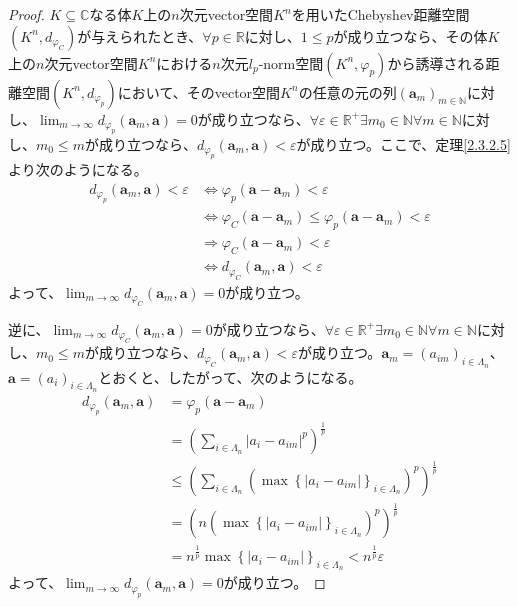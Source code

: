 \documentclass[dvipdfmx]{jsarticle}
\begin{document}
\begin{proof}
$K \subseteq \mathbb{C}$なる体$K$上の$n$次元vector空間$K^{n}$を用いたChebyshev距離空間$\left( K^{n},d_{\varphi_{C}} \right)$が与えられたとき、$\forall p \in \mathbb{R}$に対し、$1 \leq p$が成り立つなら、その体$K$上の$n$次元vector空間$K^{n}$における$n$次元$l_{p}$-norm空間$\left( K^{n},\varphi_{p} \right)$から誘導される距離空間$\left( K^{n},d_{\varphi_{p}} \right)$において、そのvector空間$K^{n}$の任意の元の列$\left( \mathbf{a}_{m} \right)_{m \in \mathbb{N}}$に対し、$\lim_{m \rightarrow \infty}{d_{\varphi_{p}}\left( \mathbf{a}_{m},\mathbf{a} \right)} = 0$が成り立つなら、$\forall\varepsilon \in \mathbb{R}^{+}\exists m_{0} \in \mathbb{N}\forall m \in \mathbb{N}$に対し、$m_{0} \leq m$が成り立つなら、$d_{\varphi_{p}}\left( \mathbf{a}_{m},\mathbf{a} \right) < \varepsilon$が成り立つ。ここで、定理\ref{2.3.2.5}より次のようになる。
\begin{align*}
d_{\varphi_{p}}\left( \mathbf{a}_{m},\mathbf{a} \right) < \varepsilon &\Leftrightarrow \varphi_{p}\left( \mathbf{a} - \mathbf{a}_{m} \right) < \varepsilon\\
&\Leftrightarrow \varphi_{C}\left( \mathbf{a} - \mathbf{a}_{m} \right) \leq \varphi_{p}\left( \mathbf{a} - \mathbf{a}_{m} \right) < \varepsilon\\
&\Rightarrow \varphi_{C}\left( \mathbf{a} - \mathbf{a}_{m} \right) < \varepsilon\\
&\Leftrightarrow d_{\varphi_{C}}\left( \mathbf{a}_{m},\mathbf{a} \right) < \varepsilon
\end{align*}
よって、$\lim_{m \rightarrow \infty}{d_{\varphi_{C}}\left( \mathbf{a}_{m},\mathbf{a} \right)} = 0$が成り立つ。\par
逆に、$\lim_{m \rightarrow \infty}{d_{\varphi_{C}}\left( \mathbf{a}_{m},\mathbf{a} \right)} = 0$が成り立つなら、$\forall\varepsilon \in \mathbb{R}^{+}\exists m_{0} \in \mathbb{N}\forall m \in \mathbb{N}$に対し、$m_{0} \leq m$が成り立つなら、$d_{\varphi_{C}}\left( \mathbf{a}_{m},\mathbf{a} \right) < \varepsilon$が成り立つ。$\mathbf{a}_{m} = \left( a_{im} \right)_{i \in \varLambda_{n}}$、$\mathbf{a} = \left( a_{i} \right)_{i \in \varLambda_{n}}$とおくと、したがって、次のようになる。
\begin{align*}
d_{\varphi_{p}}\left( \mathbf{a}_{m},\mathbf{a} \right) &= \varphi_{p}\left( \mathbf{a} - \mathbf{a}_{m} \right)\\
&= \left( \sum_{i \in \varLambda_{n}} \left| a_{i} - a_{im} \right|^{p} \right)^{\frac{1}{p}}\\
&\leq \left( \sum_{i \in \varLambda_{n}} \left( \max\left\{ \left| a_{i} - a_{im} \right| \right\}_{i \in \varLambda_{n}} \right)^{p} \right)^{\frac{1}{p}}\\
&= \left( n\left( \max\left\{ \left| a_{i} - a_{im} \right| \right\}_{i \in \varLambda_{n}} \right)^{p} \right)^{\frac{1}{p}}\\
&= n^{\frac{1}{p}}\max\left\{ \left| a_{i} - a_{im} \right| \right\}_{i \in \varLambda_{n}} < n^{\frac{1}{p}}\varepsilon
\end{align*}
よって、$\lim_{m \rightarrow \infty}{d_{\varphi_{p}}\left( \mathbf{a}_{m},\mathbf{a} \right)} = 0$が成り立つ。
\end{proof}
\end{document}
